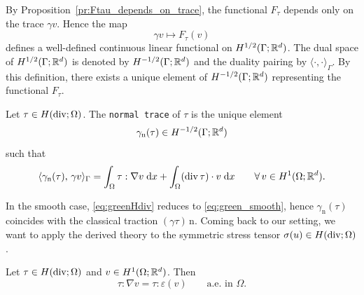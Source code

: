By Proposition~\ref{pr:Ftau_depends_on_trace}, the functional $F_\tau$ depends only on the trace $\gamma v$. Hence the map
\begin{equation*}
	\gamma v \mapsto F_\tau(v)
\end{equation*}
defines a well-defined continuous linear functional on $H^{1/2}(\Gamma;{\mathbb R}^d)$. The dual space of $H^{1/2}(\Gamma;{\mathbb R}^d)$ is denoted by $H^{-1/2}(\Gamma;{\mathbb R}^d)$ and the duality pairing by $\langle\cdot,\cdot\rangle_\Gamma$. By this definition, there exists a unique element of $H^{-1/2}(\Gamma;{\mathbb R}^d)$ representing the functional $F_\tau$.

\begin{definition}\label{def:normal_trace}
	Let $\tau\in H(\diver;\Omega)$. The {\tt normal trace} of $\tau$ is the unique element
	\begin{equation*}
		\gamma_{\mathrm{n}}(\tau)\in H^{-1/2}(\Gamma;{\mathbb R}^d)
	\end{equation*}
	such that
	\begin{equation}\label{eq:greenHdiv}
		\langle \gamma_{\mathrm{n}}(\tau),\,\gamma v\rangle_{\Gamma}
		=
		\int_\Omega \tau:\nabla v\;\dx + \int_\Omega (\diver\tau)\cdot v\;\dx
		\qquad\forall\,v\in H^1(\Omega;\R^d).
	\end{equation}
\end{definition}

In the smooth case, \eqref{eq:greenHdiv} reduces to \eqref{eq:green_smooth}, hence $\gamma_{\mathrm{n}}(\tau)$ coincides with the classical traction $(\gamma\tau)\,\mathrm n$. Coming back to our setting, we want to apply the derived theory to the symmetric stress tensor $\sigma(u)\in H(\diver;\Omega)$.

\begin{proposition}\label{pr:symtensor}
	Let $\tau\in H(\diver;\Omega)$ and $v\in H^1(\Omega;{\mathbb R}^d)$. Then
	\begin{equation*}
		\tau:\nabla v=\tau:\varepsilon(v)
		\qquad \text{a.e.\ in }\Omega.
	\end{equation*}
\end{proposition}


